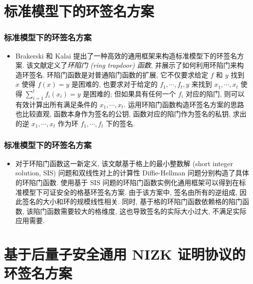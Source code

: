 \documentclass{beamer}
\begin{document}
\section{标准模型下的环签名方案}
\begin{frame}
    \frametitle{}

    \sectionpage

\end{frame}
\begin{frame}
    \frametitle{标准模型下的环签名方案}
    \begin{itemize}
        \item Brakerski 和 Kalai  提出了一种高效的通用框架来构造标准模型下的环签名方案. 该文献定义了\emph{环陷门 (ring trapdoor) 函数}, 并展示了如何利用环陷门来构造环签名. 环陷门函数是对普通陷门函数的扩展, 它不仅要求给定 $f$ 和 $y$ 找到 $x$ 使得 $f(x)=y$ 是困难的, 也要求对于给定的 $f_{1}, \cdots, f_{t}, y$ 来找到 $x_{1}, \cdots, x_{t}$ 使得 $\sum_{i=1}^{t} f_{i}\left(x_{i}\right)=y$ 是困难的; 但如果具有任何一个 $f_{i}$ 对应的陷门, 则可以有效计算出所有满足条件的 $x_{1}, \cdots, x_{t} .$ 运用环陷门函数构造环签名方案的思路也比较直观, 函数本身作为签名的公钥, 函数对应的陷门作为签名的私钥, 求出的逆 $x_{1}, \cdots, x_{t}$ 作为环 $f_{1}, \cdots, f_{t}$ 下的签名.
        
    \end{itemize}
    

\end{frame}

\begin{frame}
    \frametitle{标准模型下的环签名方案}

    \begin{itemize}
        \item 对于环陷门函数这一新定义, 该文献基于格上的最小整数解 (short integer solution, SIS) 问题和双线性对上的计算性 Diffie-Hellman 问题分别构造了具体的环陷门函数. 使用基于 $\mathrm{SIS}$ 问题的环陷门函数实例化通用框架可以得到在标准模型下可证安全的格基环签名方案. 由于该方案中, 签名由所有的逆组成, 因此签名的大小和环的规模线性相关. 同时, 基于格的环陷门函数依赖格的陷门函数, 该陷门函数需要较大的格维度, 这也导致签名的实际大小过大, 不满足实际应用需要. 
    \end{itemize}

\end{frame}

\section{基于后量子安全通用 NIZK 证明协议的环签名方案}
\end{document}
